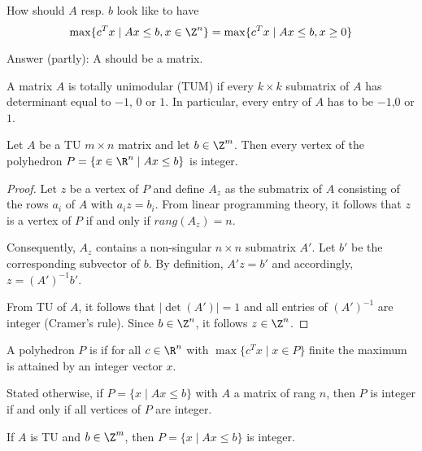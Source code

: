 \begin{lec}[2012-01-12]\end{lec}

\begin{qstn}
How should $A$ resp. $b$ look like to have
\[
	\max \{ c^T x \mid A x \leq b, x \in \Z^n \} = \max \{ c^T x \mid Ax \leq b, x \geq 0 \}
\]
\end{qstn}
Answer (partly):
A should be a  matrix.

\begin{defn}
A matrix $A$ is totally unimodular (TUM) if every $k \times k$ submatrix of
$A$ has determinant equal to $-1$, $0$ or $1$.
In particular, every entry of $A$ has to be $-1$,$0$ or $1$.
\end{defn}


\begin{thm}
Let $A$ be a TU $m \times n$ matrix and let $b \in \Z^m$.
Then every vertex of the polyhedron $P = \{ x \in \R^n \mid A x \leq b \}$
is integer.
\end{thm}
\begin{proof}
Let $z$ be a vertex of $P$ and define $A_z$ as the submatrix of $A$
consisting of the rows $a_i$ of $A$ with $a_i z = b_i$. From linear
programming theory, it follows that $z$ is a vertex of $P$ if and only if
$rang(A_z) = n$.

Consequently, $A_z$ contains a non-singular $n \times n$ submatrix $A'$.
Let $b'$ be the corresponding subvector of $b$.
By definition, $A'z=b'$ and accordingly, $z = (A')^{-1} b'$.

From TU of $A$, it follows that $|\det(A')| = 1$ and all entries of
$(A')^{-1}$ are integer (Cramer's rule). Since $b \in \Z^n$, it follows $z
\in \Z^n$.
\end{proof}

\begin{defn}
A polyhedron $P$ is  if for all $c \in \R^n$ with
$\max\{ c^T x \mid x \in P \}$ finite the maximum is attained by an integer
vector $x$.

Stated otherwise, if $P = \{ x \mid Ax \leq b \}$ with $A$ a matrix of rang
$n$, then $P$ is integer if and only if all vertices of $P$ are integer.
\end{defn}

\begin{cor}\label{cor22.4}
If $A$ is TU and $b \in \Z^m$, then $P = \{ x \mid Ax\leq b \}$ is integer.
\end{cor}

